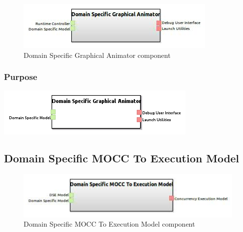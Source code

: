 \documentclass{gemoc} %
\begin{document}
\begin{figure}[htp]
	\begin{center}
	\includegraphics*[trim=0.0cm 0.0cm 0cm 0.0cm, clip=true, scale=1.0]{../images/generated/Generated_Domain Specific Graphical Animator.jpg}
	\caption{Domain Specific Graphical Animator component}
	\end{center}
\end{figure}

\subsubsection{Purpose}

\begin{center}
\includegraphics*[trim=0.0cm 0.0cm 0cm 0.0cm, clip=true]{../images/generated/Generated_Domain_Specific_Graphical_Animator.png}
\end{center}



\subsection{Domain Specific MOCC To Execution Model}

\begin{figure}[htp]
	\begin{center}
	\includegraphics*[trim=0.0cm 0.0cm 0cm 0.0cm, clip=true, scale=1.0]{../images/generated/Generated_Domain Specific MOCC To Execution Model.jpg}
	\caption{Domain Specific MOCC To Execution Model component}
	\end{center}
\end{figure}
\end{document}
